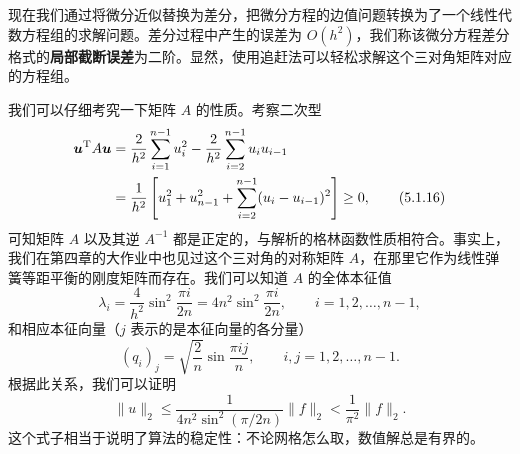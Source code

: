 现在我们通过将微分近似替换为差分，把微分方程的边值问题转换为了一个线性代数方程组的求解问题。差分过程中产生的误差为 $O(h^2)$，我们称该微分方程差分格式的\textbf{局部截断误差}为二阶。显然，使用追赶法可以轻松求解这个三对角矩阵对应的方程组。

我们可以仔细考究一下矩阵 $A$ 的性质。考察二次型
\begin{align}
\bm u^{\mathrm T}A\bm u
&=\frac{2}{h^2}\sum_{i=1}^{n-1}u_i^2-\frac{2}{h^2}\sum_{i=2}^{n-1}u_iu_{i-1}\notag\\
&=\frac1{h^2}\left[u_1^2+u_{n-1}^2+\sum_{i=2}^{n-1}(u_i-u_{i-1})^2\right]\ge0,
\tag{5.1.16}
\end{align}
可知矩阵 $A$ 以及其逆 $A^{-1}$ 都是正定的，与解析的格林函数性质相符合。事实上，我们在第四章的大作业中也见过这个三对角的对称矩阵 $A$，在那里它作为线性弹簧等距平衡的刚度矩阵而存在。我们可以知道 $A$ 的全体本征值
\begin{equation}
\lambda_i=\frac4{h^2}\sin^2\frac{\pi i}{2n}=4n^2\sin^2\frac{\pi i}{2n},\qquad i=1,2,\ldots,n-1,
\tag{5.1.17}
\end{equation}
和相应本征向量（$j$ 表示的是本征向量的各分量）
\begin{equation}
(q_i)_j=\sqrt{\frac2n}\sin\frac{\pi ij}{n},\qquad i,j=1,2,\ldots,n-1.
\tag{5.1.18}
\end{equation}
根据此关系，我们可以证明
\begin{equation}
\|u\|_2\le\frac{1}{4n^2\sin^2(\pi/2n)}\|f\|_2<\frac1{\pi^2}\|f\|_2.
\tag{5.1.19}
\end{equation}
这个式子相当于说明了算法的稳定性：不论网格怎么取，数值解总是有界的。

